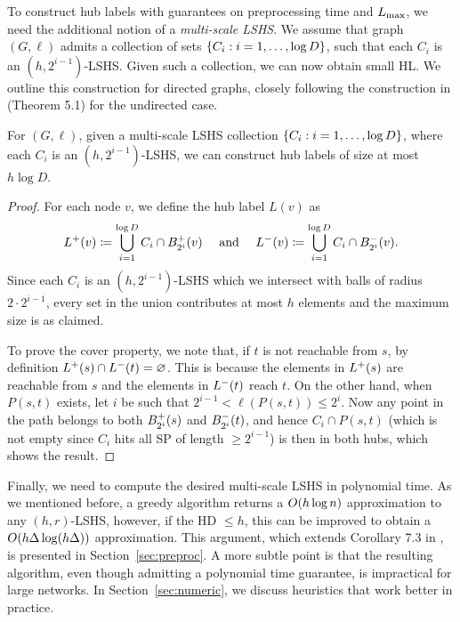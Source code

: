 To construct hub labels with guarantees on preprocessing time and $\Lm$, we need the additional notion of a \emph{multi-scale LSHS}. 
We assume that graph $(G,\ell)$ admits a collection of sets $\crl*{C_i: i=1,\ldots,\log D}$, such that each $C_i$ is an $(h,2^{i-1})$-LSHS.
Given such a collection, we can now obtain small HL.
We outline this construction for directed graphs, closely following the construction in \cite{highway2013} (Theorem 5.1) for the undirected case.
\begin{proposition}
\label{theo:construct_hl}
For $(G,\ell)$, given a multi-scale LSHS collection $\crl*{C_i:i=1,\ldots,\log D}$, where each $C_i$ is an $(h,2^{i-1})$-LSHS, we can construct hub labels of size at most $h\log D$.
\end{proposition}
\begin{proof}
For each node $v$, we define the hub label $L(v)$ as
\[
\Lf(v)\defeq  \bigcup_{i=1}^{\log D}C_i\cap \Bf_{2^i}(v) \quad\text{ and }\quad
\Lb(v)\defeq \bigcup_{i=1}^{\log D}C_i\cap \Bb_{2^i}(v).
\]
Since each $C_i$ is an $(h,2^{i-1})$-LSHS which we intersect with balls of radius $2\cdot 2^{i-1}$, every set in the union contributes at most $h$ elements and the maximum size is as claimed.

To prove the cover property, we note that, if $t$ is not reachable from $s$, by definition $\Lf(s)\cap\Lb(t)=\varnothing$.
This is because the elements in $\Lf(s)$ are reachable from $s$ and the elements in $\Lb(t)$ reach $t$.
On the other hand, when $P(s,t)$ exists, let $i$ be such that $2^{i-1}<\ell(P(s,t))\leq 2^i$.
Now any point in the path belongs to both $\Bf_{2^i}(s)$ and $\Bb_{2^i}(t)$, and hence $C_i\cap P(s,t)$  (which is not empty since $C_i$ hits all SP of length $\geq 2^{i-1}$) is then in both hubs, which shows the result.
\end{proof}


Finally, we need to compute the desired multi-scale LSHS in polynomial time.
As we mentioned before, a greedy algorithm returns a $\Or(h\log n)$ approximation to any $(h,r)$-LSHS, however, if the HD $\leq h$, this can be improved to obtain a $\Or(h\Delta\log(h\Delta))$ approximation.
This argument, which extends Corollary 7.3 in \cite{highway2013}, is presented in Section~\ref{sec:preproc}.
A more subtle point is that the resulting algorithm, even though admitting a polynomial time guarantee, is impractical for large networks.
In Section~\ref{sec:numeric}, we discuss heuristics that work better in practice.